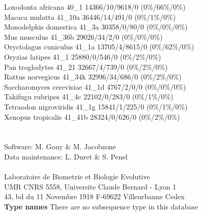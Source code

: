 \documentclass{article}
\begin{document}
\begin{Schunk}
Loxodonta africana                      40\_1 14366/10/9618/0 (0\%/66\%/0\%)\\
Macaca mulatta                          41\_10a 36446/14/491/0 (0\%/1\%/0\%)\\
Monodelphis domestica                   41\_3a 30358/0/80/0 (0\%/0\%/0\%)\\
Mus musculus                            41\_36b 29026/34/2/0 (0\%/0\%/0\%)\\
Oryctolagus cuniculus                   41\_1a 13705/4/8615/0 (0\%/62\%/0\%)\\
Oryzias latipes                         41\_1 25880/0/546/0 (0\%/2\%/0\%)\\
Pan troglodytes                         41\_21 32667/4/739/0 (0\%/2\%/0\%)\\
Rattus norvegicus                       41\_34k 32996/34/686/0 (0\%/2\%/0\%)\\
Saccharomyces cerevisiae                41\_1d 4767/2/0/0 (0\%/0\%/0\%)\\
Takifugu rubripes                       41\_4c 22102/0/283/0 (0\%/1\%/0\%)\\
Tetraodon nigroviridis                  41\_1g 15841/1/225/0 (0\%/1\%/0\%)\\
Xenopus tropicalis                      41\_41b 28324/0/626/0 (0\%/2\%/0\%)\\
 \\
	     \\
Software: M. Gouy \& M. Jacobzone\\
Data maintenance: L. Duret \& S. Penel\\
\\
Laboratoire de Biometrie et Biologie Evolutive\\
UMR CNRS 5558, Universite Claude Bernard - Lyon 1 \\
43, bd du 11 Novembre 1918 F-69622 Villeurbanne Cedex\\


\textbf{Type names}
There are no subsequence type in this database

\end{Schunk}
\end{document}
